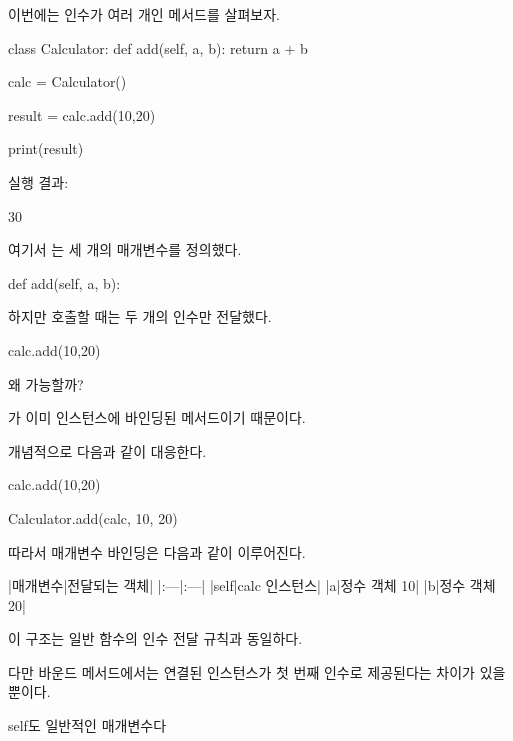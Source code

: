 이번에는 인수가 여러 개인 메서드를 살펴보자.

\begin{dhkcode}
class Calculator:
    def add(self, a, b):
        return a + b
    
calc = Calculator()

result = calc.add(10,20)

print(result)
\end{dhkcode}

실행 결과:

\begin{dhkzsh}
30
\end{dhkzsh}

여기서 는 세 개의 매개변수를 정의했다.

\begin{dhkcode}
def add(self, a, b):
\end{dhkcode}

하지만 호출할 때는 두 개의 인수만 전달했다.

\begin{dhkcode}
calc.add(10,20)
\end{dhkcode}

왜 가능할까?

가 이미  인스턴스에 바인딩된 메서드이기 때문이다.

개념적으로 다음과 같이 대응한다.

\begin{dhkcode}
calc.add(10,20)
\end{dhkcode}

\begin{dhkcode}
Calculator.add(calc, 10, 20)
\end{dhkcode}

따라서 매개변수 바인딩은 다음과 같이 이루어진다.

\begin{dhktable}
|매개변수|전달되는 객체|
|:---|:---|
|self|calc 인스턴스|
|a|정수 객체 10|
|b|정수 객체 20|
\end{dhktable}

이 구조는 일반 함수의 인수 전달 규칙과 동일하다.

다만 바운드 메서드에서는 연결된 인스턴스가 첫 번째 인수로 제공된다는 차이가 있을 뿐이다.

\begin{dhknote}
\begin{dhksmry}[centered]
self도 일반적인 매개변수다
\end{dhksmry}
\end{dhknote}


